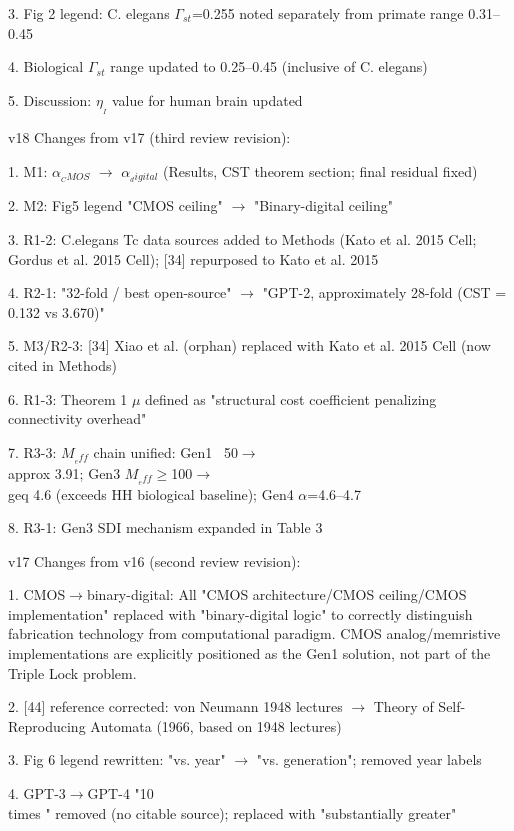 \documentclass[a4paper,12pt]{article}
\begin{document}
3. Fig 2 legend: C. elegans $\Gamma_{st}$=0.255 noted separately from primate range 0.31--0.45

4. Biological $\Gamma_{st}$ range updated to 0.25--0.45 (inclusive of C. elegans)

5. Discussion: $\eta_{_I}$ value for human brain updated

v18 Changes from v17 (third review revision):

1. M1: $\alpha_{_CMOS}$ $\rightarrow$ $\alpha_{_digital}$ (Results, CST theorem section; final residual fixed)

2. M2: Fig5 legend "CMOS ceiling" $\rightarrow$ "Binary-digital ceiling"

3. R1-2: C.elegans Tc data sources added to Methods (Kato et al. 2015 Cell; Gordus et al. 2015 Cell); [34] repurposed to Kato et al. 2015

4. R2-1: "32-fold / best open-source" $\rightarrow$ "GPT-2, approximately 28-fold (CST = 0.132 vs 3.670)"

5. M3/R2-3: [34] Xiao et al. (orphan) replaced with Kato et al. 2015 Cell (now cited in Methods)

6. R1-3: Theorem 1 $\mu$ defined as "structural cost coefficient penalizing connectivity overhead"

7. R3-3: $M_{_eff}$ chain unified: Gen1 ~50$\rightarrow$\alpha \\approx 3.91; Gen3 $M_{_eff}\geq$100$\rightarrow$\alpha \\geq 4.6 (exceeds HH biological baseline); Gen4 $\alpha$=4.6--4.7

8. R3-1: Gen3 SDI mechanism expanded in Table 3

v17 Changes from v16 (second review revision):

1. CMOS$\rightarrow$binary-digital: All "CMOS architecture/CMOS ceiling/CMOS implementation" replaced with "binary-digital logic" to correctly distinguish fabrication technology from computational paradigm. CMOS analog/memristive implementations are explicitly positioned as the Gen1 solution, not part of the Triple Lock problem.

2. [44] reference corrected: von Neumann 1948 lectures $\rightarrow$ Theory of Self-Reproducing Automata (1966, based on 1948 lectures)

3. Fig 6 legend rewritten: "vs. year" $\rightarrow$ "vs. generation"; removed year labels

4. GPT-3$\rightarrow$GPT-4 "10 \\times " removed (no citable source); replaced with "substantially greater"
\end{document}
